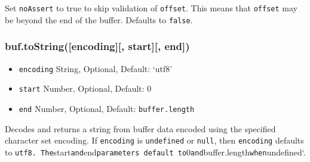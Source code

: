 Set \texttt{noAssert} to true to skip validation of \texttt{offset}.
This means that \texttt{offset} may be beyond the end of the buffer.
Defaults to \texttt{false}.

\subsubsection{buf.toString({[}encoding{]}{[}, start{]}{[},
end{]})}\label{buf.tostringencoding-start-end}

\begin{itemize}
\itemsep1pt\parskip0pt
\item
  \texttt{encoding} String, Optional, Default: `utf8'
\item
  \texttt{start} Number, Optional, Default: 0
\item
  \texttt{end} Number, Optional, Default: \texttt{buffer.length}
\end{itemize}

Decodes and returns a string from buffer data encoded using the
specified character set encoding. If \texttt{encoding} is
\texttt{undefined} or \texttt{null}, then \texttt{encoding} defaults to
\texttt{\textquotesingle{}utf8\textquotesingle{}.\ The}start\texttt{and}end\texttt{parameters\ default\ to}0\texttt{and}buffer.length\texttt{when}undefined`.

\begin{Shaded}
\begin{Highlighting}[]
 \NormalTok{(}\NormalTok{);}
 \NormalTok{(}   
  \NormalTok{; }
\NormalTok{\}}
\NormalTok{(}\NormalTok{); }
\NormalTok{(}\NormalTok{,}\NormalTok{,}\NormalTok{); }
\NormalTok{(}\NormalTok{,}\NormalTok{,}\NormalTok{); }
\NormalTok{(}\NormalTok{,}\NormalTok{,}\NormalTok{); }
\end{Highlighting}
\end{Shaded}


